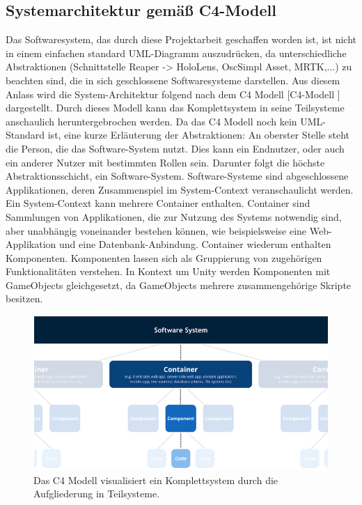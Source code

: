 \documentclass[11pt, titlepage, fleqn]{report}
\begin{document}
            \subsection{Systemarchitektur gemäß C4-Modell}
            \label{sec:3.3.1}
                Das Softwaresystem, das durch diese Projektarbeit geschaffen worden ist, ist nicht in einem einfachen standard 
                UML-Diagramm auszudrücken, da unterschiedliche Abstraktionen (Schnittstelle Reaper -> HoloLens, OscSimpl Asset, MRTK,...) 
                zu beachten sind, die in sich geschlossene Softwaresysteme darstellen. Aus diesem Anlass wird die System-Architektur 
                folgend nach dem C4 Modell [C4-Modell \cite{C4}] dargestellt. 
                Durch dieses 
                Modell kann das Komplettsystem in seine Teilsysteme 
                anschaulich heruntergebrochen werden. 
                Da das C4 Modell noch kein UML-Standard ist, eine kurze Erläuterung der Abstraktionen: 
                An oberster Stelle steht die Person, die das Software-System nutzt. Dies kann ein Endnutzer, oder auch ein anderer Nutzer 
                mit bestimmten Rollen sein.
                Darunter folgt die höchste Abstraktionsschicht, ein Software-System. Software-Systeme sind abgeschlossene Applikationen, 
                deren Zusammenspiel im System-Context veranschaulicht werden.
                Ein System-Context kann mehrere Container enthalten. Container sind Sammlungen von Applikationen, die zur Nutzung des 
                Systems notwendig sind, aber unabhängig voneinander bestehen können, wie beispielsweise eine Web-Applikation und eine 
                Datenbank-Anbindung.
                Container wiederum enthalten Komponenten. Komponenten lassen sich als Gruppierung von zugehörigen Funktionalitäten 
                verstehen. In Kontext um Unity werden Komponenten mit GameObjects gleichgesetzt, da GameObjects mehrere zusammengehörige 
                Skripte besitzen.
                \vspace{1cm}
                \begin{figure}[htbp]
                    \centering
                    \includegraphics[width=\linewidth]{./img/C4Model.png}
                    \caption[C4 Modell - allgemein]{Das C4 Modell visualisiert ein Komplettsystem durch die Aufgliederung in Teilsysteme.\label{fig:C4}}
                \end{figure}
\end{document}
